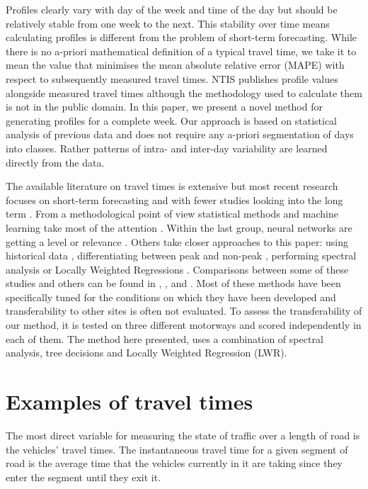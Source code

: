 \documentclass[letterpaper, 10 pt, conference]{ieeeconf}  %
\begin{document}
Profiles clearly vary with day of the week and time of the day but should be relatively stable from one week to the next.
This stability over time means calculating profiles is different from the problem of short-term forecasting.
While there is no a-priori mathematical definition of a typical travel time,  we take it to mean the value that minimises the mean absolute relative error (MAPE) with respect to subsequently measured travel times.
NTIS publishes profile values alongside measured travel times although the methodology used to calculate them is not in the public domain. 
In this paper, we present a novel method for generating profiles for a complete week. 
Our approach is based on statistical analysis of previous data and does not require any a-priori segmentation of days into classes. 
Rather patterns of intra- and inter-day variability are learned directly from the data.

The available literature on travel times is extensive but most recent research focuses on short-term forecasting and with fewer studies looking into the long term \cite{long-term} \cite{long-term-2}. 
From a methodological point of view statistical methods and machine learning take most of the attention \cite{should}. Within the last group, neural networks are getting a level or relevance \cite{NN} \cite{spectral2} .
Others take closer approaches to this paper: using historical data \cite{simple} \cite{dynamic-historic}, differentiating between peak and non-peak \cite{peak-historic}, performing spectral analysis \cite{spectral1} or Locally Weighted Regressions \cite{williams} \cite{sun} \cite{zhong} \cite{chowdhury} \cite{acqua} \cite{vana}.
Comparisons between some of these studies and others can be found in \cite{nikovski}, \cite{lint}, \cite{mori} and \cite{ser}. 
Most of these methods have been specifically tuned for the conditions on which they have been developed and transferability to other sites is often not evaluated.
To assess the transferability of our method, it is tested on three different motorways and scored independently in each of them.
The method here presented, uses a combination of spectral analysis, tree decisions and Locally Weighted Regression (LWR).
\section{Examples of travel times} 
The most direct variable for measuring the state of traffic over a length of road is the vehicles' travel times. 
The instantaneous travel time for a given segment of road is the average time that the vehicles currently in it are taking since they enter the segment until they exit it.\\
\end{document}
